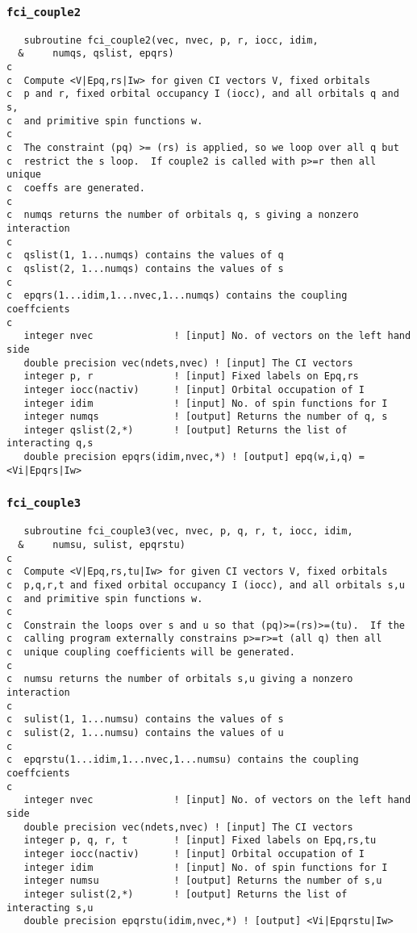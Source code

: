 \documentclass[fullpage,12pt,fleqn]{article}
\begin{document}
\subsubsection{{\tt fci\_couple2}}
\begin{verbatim}
   subroutine fci_couple2(vec, nvec, p, r, iocc, idim, 
  &     numqs, qslist, epqrs)
c  
c  Compute <V|Epq,rs|Iw> for given CI vectors V, fixed orbitals
c  p and r, fixed orbital occupancy I (iocc), and all orbitals q and s,
c  and primitive spin functions w.
c
c  The constraint (pq) >= (rs) is applied, so we loop over all q but
c  restrict the s loop.  If couple2 is called with p>=r then all unique
c  coeffs are generated.
c
c  numqs returns the number of orbitals q, s giving a nonzero interaction
c  
c  qslist(1, 1...numqs) contains the values of q
c  qslist(2, 1...numqs) contains the values of s
c  
c  epqrs(1...idim,1...nvec,1...numqs) contains the coupling coeffcients
c  
   integer nvec              ! [input] No. of vectors on the left hand side
   double precision vec(ndets,nvec) ! [input] The CI vectors
   integer p, r              ! [input] Fixed labels on Epq,rs
   integer iocc(nactiv)      ! [input] Orbital occupation of I
   integer idim              ! [input] No. of spin functions for I
   integer numqs             ! [output] Returns the number of q, s
   integer qslist(2,*)       ! [output] Returns the list of interacting q,s
   double precision epqrs(idim,nvec,*) ! [output] epq(w,i,q) = <Vi|Epqrs|Iw>
\end{verbatim}

\subsubsection{{\tt fci\_couple3}}
\begin{verbatim}
   subroutine fci_couple3(vec, nvec, p, q, r, t, iocc, idim, 
  &     numsu, sulist, epqrstu)
c  
c  Compute <V|Epq,rs,tu|Iw> for given CI vectors V, fixed orbitals
c  p,q,r,t and fixed orbital occupancy I (iocc), and all orbitals s,u
c  and primitive spin functions w.
c
c  Constrain the loops over s and u so that (pq)>=(rs)>=(tu).  If the
c  calling program externally constrains p>=r>=t (all q) then all
c  unique coupling coefficients will be generated.
c  
c  numsu returns the number of orbitals s,u giving a nonzero interaction
c  
c  sulist(1, 1...numsu) contains the values of s
c  sulist(2, 1...numsu) contains the values of u
c  
c  epqrstu(1...idim,1...nvec,1...numsu) contains the coupling coeffcients
c  
   integer nvec              ! [input] No. of vectors on the left hand side
   double precision vec(ndets,nvec) ! [input] The CI vectors
   integer p, q, r, t        ! [input] Fixed labels on Epq,rs,tu
   integer iocc(nactiv)      ! [input] Orbital occupation of I
   integer idim              ! [input] No. of spin functions for I
   integer numsu             ! [output] Returns the number of s,u
   integer sulist(2,*)       ! [output] Returns the list of interacting s,u
   double precision epqrstu(idim,nvec,*) ! [output] <Vi|Epqrstu|Iw>
\end{verbatim}
\end{document}
